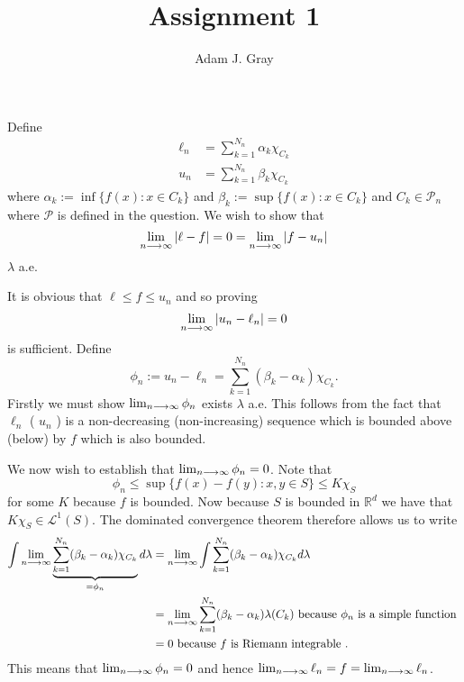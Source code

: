 \documentclass{unswmaths}
\begin{document}
\author{Adam J. Gray}
\title{Assignment 1}
\subject{Measure Theory}

\newcommand{\llra}{\Leftrightarrow}

\unswtitle

\section{}
\subsection{}
Define
\begin{align*}
    \ell_n &= \sum_{k=1}^{N_n} \alpha_k \chi_{C_k} \\
    u_n &= \sum_{k=1}^{N_n} \beta_k \chi_{C_k} 
\end{align*}
where $ \alpha_k := \inf\{ f(x) : x \in C_k \} $ and $ \beta_k := \sup\{ f(x) : x \in C_k \} $ and $ C_k \in \mathcal{P}_n $ where $ \mathcal{P} $ is defined in the question.
We wish to show that $$ \lim_{n\longrightarrow\infty} | \ell - f | = 0 = \lim_{n\longrightarrow\infty} | f - u_n | $$  $ \lambda $ a.e.

It is obvious that $ \ell \leq f \leq u_n $ and so proving $$ \lim_{n\longrightarrow\infty} |u_n - \ell_n| = 0 $$ is sufficient.
Define $$ \phi_n := u_n - \ell_n = \sum_{k=1}^{N_n} (\beta_k - \alpha_k) \chi_{C_k}. $$
Firstly we must show $ \lim_{n\longrightarrow\infty} \phi_n $ exists $ \lambda $ a.e. This follows from the fact that $ \ell_n $ ( $u_n$ ) is a non-decreasing (non-increasing) sequence which is bounded above (below) by $ f $ which is also bounded. 

We now wish to establish that $ \lim_{n\longrightarrow\infty} \phi_n = 0 $. Note that 
$$
    \phi_n \leq \sup\{ f(x)-f(y) : x,y \in S \} \leq K\chi_{S}
$$
for some $ K $ because $ f $ is bounded. Now because $ S $ is bounded in $ \mathbb{R}^d $ we have that $ K\chi_S \in \mathcal{L}^1(S) $. The dominated convergence theorem therefore allows us to write  
\begin{align*}
    \int \lim_{n\longrightarrow\infty} \underbrace{\sum_{k=1}^{N_n}(\beta_k - \alpha_k) \chi_{C_k}}_{=\phi_n} d\lambda &=
        \lim_{n \longrightarrow\infty} \int \sum_{k=1}^{N_n} (\beta_k - \alpha_k) \chi_{C_k} d\lambda \\
    &=  \lim_{n \longrightarrow\infty} \sum_{k=1}^{N_n} (\beta_k - \alpha_k) \lambda(C_k) \text{ because } \phi_n \text{ is a simple function }\\
    &= 0 \text{ because } f \text{ is Riemann integrable }.
\end{align*}
This means that $ \lim_{n\longrightarrow\infty} \phi_n = 0 $ and hence $ \lim_{n\longrightarrow\infty} \ell_n = f = \lim_{n\longrightarrow\infty} \ell_n $.
\end{document}
